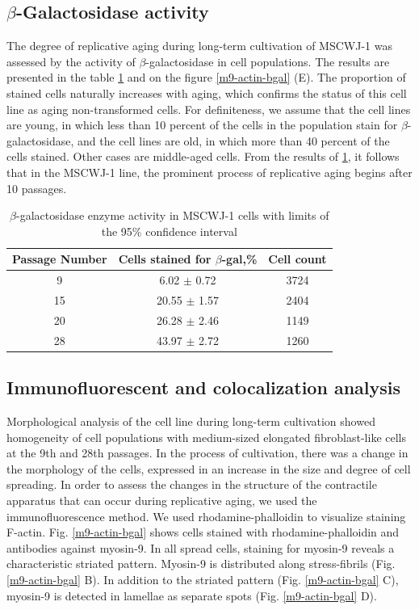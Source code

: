 \documentclass[english,authoryear]{elsarticle}
\begin{document}
\subsection{$\beta$-Galactosidase activity}


The degree of replicative aging during long-term cultivation of MSCWJ-1 was assessed by the activity of $\beta$-galactosidase in cell populations.
The results are presented in the table \ref{tab} and on the figure \ref{m9-actin-bgal} (E).
The proportion of stained cells naturally increases with aging, which confirms the status of this cell line as aging non-transformed cells.
For definiteness, we assume that  the cell lines are young, in which less than 10 percent of the cells in the population stain for $\beta$-galactosidase, and
the cell lines are old, in which more than 40 percent of the cells stained. Other cases are middle-aged cells.
From the results of \ref{tab}, it follows that in the MSCWJ-1 line, the prominent process of replicative aging begins after 10 passages.


\begin{table}[ht]
  \caption{$\beta$-galactosidase enzyme activity in MSCWJ-1 cells with limits of the 95\% confidence interval}
  \label{tab}
\centering
\begin{tabular}{c|c|c}
 Passage Number & Cells stained for $\beta$-gal,\% & Cell count  \\
 \hline
 9 & 6.02 $\pm$ 0.72 & 3724 \\
 15 & 20.55 $\pm$ 1.57 & 2404 \\
 20 & 26.28 $\pm$ 2.46 & 1149  \\
 28 & 43.97 $\pm$ 2.72 & 1260

\end{tabular}
\end{table}

\subsection{Immunofluorescent and colocalization analysis}

Morphological analysis of the cell line during long-term cultivation showed homogeneity of cell populations with medium-sized elongated fibroblast-like cells at the 9th and 28th passages.
In the process of cultivation, there was a change in the morphology of the cells, expressed in an increase in the size and degree of cell spreading.
In order to assess the changes in the structure of the contractile apparatus that can occur during replicative aging, we used the immunofluorescence method.
We used rhodamine-phalloidin to visualize staining F-actin.
Fig. \ref{m9-actin-bgal} shows cells stained with rhodamine-phalloidin and antibodies against myosin-9.
In all spread cells, staining for myosin-9 reveals a characteristic striated pattern.
Myosin-9 is distributed along stress-fibrils (Fig. \ref{m9-actin-bgal} B).
In addition to the striated pattern (Fig. \ref{m9-actin-bgal} C), myosin-9 is detected in lamellae as separate spots (Fig. \ref{m9-actin-bgal} D).
\end{document}

